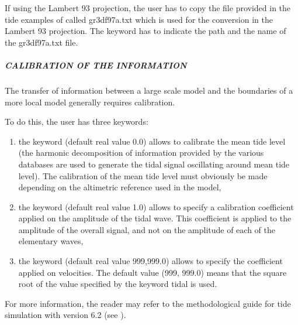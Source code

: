 If using the Lambert 93 projection, the user has to copy the file provided
in the tide examples of  called gr3df97a.txt which is used
for the conversion in the Lambert 93 projection.
The keyword  has to indicate the path
and the name of the gr3df97a.txt file.

\subparagraph{ CALIBRATION OF THE INFORMATION}

 The transfer of information between a large scale model and the boundaries of a more local model generally requires calibration.

 To do this, the user has three keywords:

\begin{enumerate}
\item  the keyword  (default real value 0.0) allows to calibrate the mean tide level (the harmonic decomposition of information provided by the various databases are used to generate the tidal signal oscillating around mean tide level). The calibration of the mean tide level must obviously be made depending on the altimetric reference used in the model,

\item  the keyword  (default real value 1.0) allows to specify a calibration coefficient applied on the amplitude of the tidal wave. This coefficient is applied to the amplitude of the overall signal, and not on the amplitude of each of the elementary waves,

\item  the keyword  (default real value 999,999.0) allows to specify the coefficient applied on velocities. The default value (999, 999.0) means that the square root of the value specified by the keyword  tidal is used.
\end{enumerate}

 For more information, the reader may refer to the methodological guide for tide simulation with version 6.2 (see \cite{Pham2012}).
